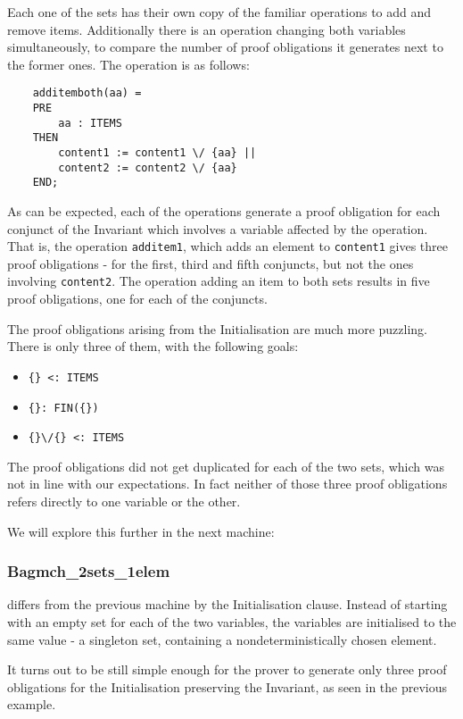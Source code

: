 \documentclass[11pt,journal]{IEEEtran}
\begin{document}
	Each one of the sets has their own copy of the familiar operations to add and remove items. Additionally there is an operation changing both variables simultaneously, to compare the number of proof obligations it generates next to the former ones. The operation is as follows:
	
	\begin{lstlisting}
	additemboth(aa) =
	PRE
		aa : ITEMS
	THEN
		content1 := content1 \/ {aa} ||
		content2 := content2 \/ {aa}
	END;
	\end{lstlisting}
	
	As can be expected, each of the operations generate a proof obligation for each conjunct of the Invariant which involves a variable affected by the operation. That is, the operation \texttt{additem1}, which adds an element to \texttt{content1} gives three proof obligations - for the first, third and fifth conjuncts, but not the ones involving \texttt{content2}. The operation adding an item to both sets results in five proof obligations, one for each of the conjuncts.
	
	The proof obligations arising from the Initialisation are much more puzzling. There is only three of them, with the following goals:
	\begin{itemize}
		\item \verb|{} <: ITEMS |
		\item \verb|{}: FIN({}) |
		\item \verb|{}\/{} <: ITEMS|
	\end{itemize}
	The proof obligations did not get duplicated for each of the two sets, which was not in line with our expectations. In fact neither of those three proof obligations refers directly to one variable or the other. 
	
	We will explore this further in the next machine:
	
	\subsubsection{Bagmch\_2sets\_1elem} differs from the previous machine by the Initialisation clause. Instead of starting with an empty set for each of the two variables, the variables are initialised to the same value - a singleton set, containing a nondeterministically chosen element. 
	
	It turns out to be still simple enough for the prover to generate only three proof obligations for the Initialisation preserving the Invariant, as seen in the previous example.
	
\end{document}
